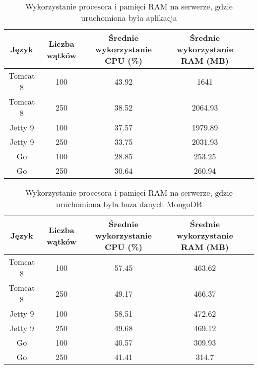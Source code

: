 
\begin{table}[!htb]
\centering
\caption{Wykorzystanie procesora i pamięci RAM na serwerze, gdzie uruchomiona była aplikacja}
\label{tab:app-full-all}
\begin{tabular}{@{}ccccl@{}}
\toprule
\textbf{Język} & \textbf{Liczba wątków} & \multicolumn{1}{p{3cm}}{\textbf{Średnie wykorzystanie CPU (\%)}} & \multicolumn{1}{p{3cm}}{\textbf{Średnie wykorzystanie RAM (MB)}} &  \\ \midrule
Tomcat 8       & 100                    & 43.92                             & 1641                          &  \\
Tomcat 8       & 250                    & 38.52                             & 2064.93                          &  \\
Jetty 9       & 100                    & 37.57                             & 1979.89                          &  \\
Jetty 9       & 250                    & 33.75                             & 2031.93                          &  \\
Go       & 100                    & 28.85                             & 253.25                          &  \\
Go       & 250                    & 30.64                             & 260.94                          &  \\
\bottomrule
\end{tabular}
\end{table}


\begin{table}[!htb]
\centering
\caption{Wykorzystanie procesora i pamięci RAM na serwerze, gdzie uruchomiona była baza danych MongoDB}
\label{tab:mongo-full-all}
\begin{tabular}{@{}ccccl@{}}
\toprule
\textbf{Język} & \textbf{Liczba wątków} & \multicolumn{1}{p{3cm}}{\textbf{Średnie wykorzystanie CPU (\%)}} & \multicolumn{1}{p{3cm}}{\textbf{Średnie wykorzystanie RAM (MB)}} &  \\ \midrule
Tomcat 8       & 100                    & 57.45                             & 463.62                          &  \\
Tomcat 8       & 250                    & 49.17                             & 466.37                          &  \\
Jetty 9       & 100                    & 58.51                             & 472.62                          &  \\
Jetty 9       & 250                    & 49.68                             & 469.12                          &  \\
Go       & 100                    & 40.57                             & 309.93                          &  \\
Go       & 250                    & 41.41                             & 314.7                          &  \\
\bottomrule
\end{tabular}
\end{table}


